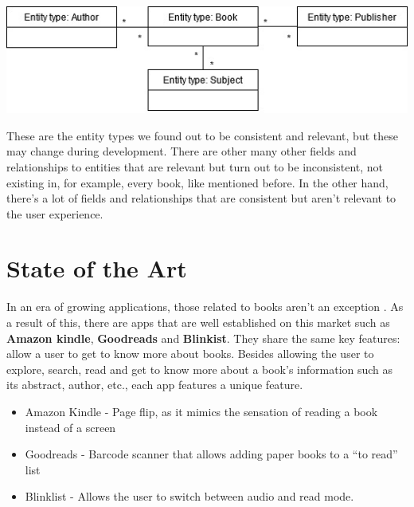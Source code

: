 \documentclass[twocolumn,twoside,11pt,a4paper]{article}
\begin{document}
\begin{dataFigure}\hspace{5mm}
    \centering\includegraphics[width=1.0\linewidth]{dataModel.jpg}
\end{dataFigure}\hspace{5mm}

These are the entity types we found out to be consistent and relevant, but these may change during development. There are other many other fields and relationships to entities that are relevant but turn out to be inconsistent, not existing in, for example, every book, like mentioned before. In the other hand, there's a lot of fields and relationships that are consistent but aren't relevant to the user experience.


\section{State of the Art}\label{sec:state of the art}

 In an era of growing applications, those related to books aren’t an exception \cite{bookApps}. As a result of this, there are apps that are well established on this market such as  \textbf{Amazon kindle}, \textbf{Goodreads} and \textbf{Blinkist}. They share the same key features: allow a user to get to know more about books. Besides allowing the user to explore, search, read and get to know more about a book’s information such as its abstract, author, etc., each app features a unique feature.

\begin{itemize}
    \item Amazon Kindle - Page flip, as it mimics the sensation of reading a book instead of a screen \cite{amazonKindle}
    \item Goodreads - Barcode scanner that allows adding paper books to a “to read” list \cite{goodreads}
    \item Blinklist - Allows the user to switch between audio and read mode. \cite{blinklist}
\end{itemize}
\end{document}
